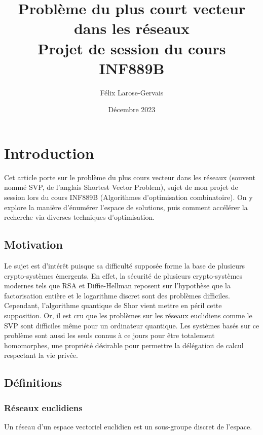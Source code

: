 \documentclass{article}
\title{Problème du plus court vecteur dans les réseaux
\\ Projet de session du cours INF889B}
\author{Félix Larose-Gervais}
\date{Décembre 2023}
\begin{document}
\begin{titlepage}
\maketitle
\thispagestyle{empty}
\end{titlepage}

\tableofcontents

\newpage

\section{Introduction}

Cet article porte sur le problème du plus cours vecteur dans les réseaux (souvent nommé SVP, de l'anglais Shortest Vector Problem), sujet de mon projet de session lors du cours INF889B (Algorithmes d'optimisation combinatoire). On y explore la manière d'énumérer l'espace de solutions, puis comment accélérer la recherche via diverses techniques d'optimisation.

\subsection{Motivation}

Le sujet est d'intérêt puisque sa difficulté supposée forme la base de plusieurs crypto-systèmes émergents. En effet, la sécurité de plusieurs crypto-systèmes modernes tels que RSA et Diffie-Hellman reposent sur l'hypothèse que la factorisation entière et le logarithme discret sont des problèmes difficiles. Cependant, l'algorithme quantique de Shor vient mettre en péril cette supposition. Or, il est cru que les problèmes sur les réseaux euclidiens comme le SVP sont difficiles même pour un ordinateur quantique. Les systèmes basés sur ce problème sont aussi les seuls connus à ce jours pour être totalement homomorphes, une propriété désirable pour permettre la délégation de calcul respectant la vie privée.

\subsection{Définitions}

\subsubsection{Réseaux euclidiens}

Un réseau d'un espace vectoriel euclidien est un sous-groupe discret de l'espace.
\end{document}
